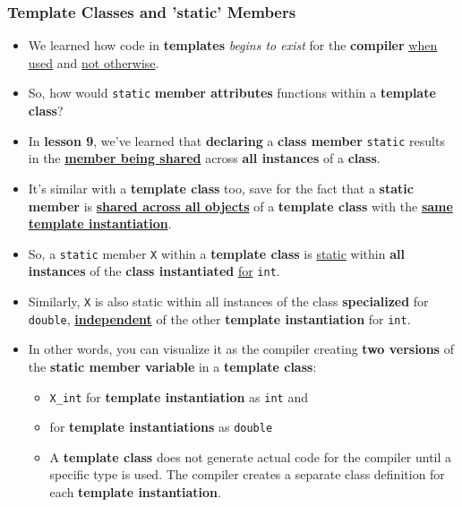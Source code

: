 \documentclass[10pt]{article}
\newcommand{\pbreak}{\vspace{30pt}}
\begin{document}
\subsubsection{Template Classes and 'static' Members}
\begin{itemize}
	\item We learned how code in \textbf{templates} \textit{begins to exist} for the \textbf{compiler} \underline{when used} and \underline{not otherwise}.

	\item So, how would \verb|static| \textbf{member attributes} functions within a \textbf{template class}?

	\item In \textbf{lesson 9}, we've learned that \textbf{declaring} a \textbf{class member} \verb|static| results in the \underline{\textbf{member being shared}} across \textbf{all instances} of a \textbf{class}.

		\pbreak

\item It's similar with a \textbf{template class} too, save for the fact that a \textbf{static member} is \underline{\textbf{shared across all objects}} of a \textbf{template class} with the \textbf{\underline{same template instantiation}}.

\item So, a \verb|static| member \verb|X| within a \textbf{template class} is \underline{static} within \textbf{all instances} of the \textbf{class instantiated} \underline{for} \verb|int|.

\item Similarly, \verb|X| is also static within all instances of the class \textbf{specialized} for \verb|double|, \underline{\textbf{independent}} of the other \textbf{template instantiation} for \verb|int|.

	\pbreak

\item In other words, you can visualize it as the compiler creating \textbf{two versions} of the \textbf{static member variable} in a \textbf{template class}: 
	\begin{itemize}
\item \verb|X_int| for \textbf{template instantiation} as \verb|int| and
\item for \textbf{template instantiations} as \verb|double|
	\end{itemize}

	\pbreak

	\begin{itemize}
    \item A \textbf{template class} does not generate actual code for the compiler until a specific type is used. The compiler creates a separate class definition for each \textbf{template instantiation}.


\end{itemize}
\end{itemize}
\end{document}
